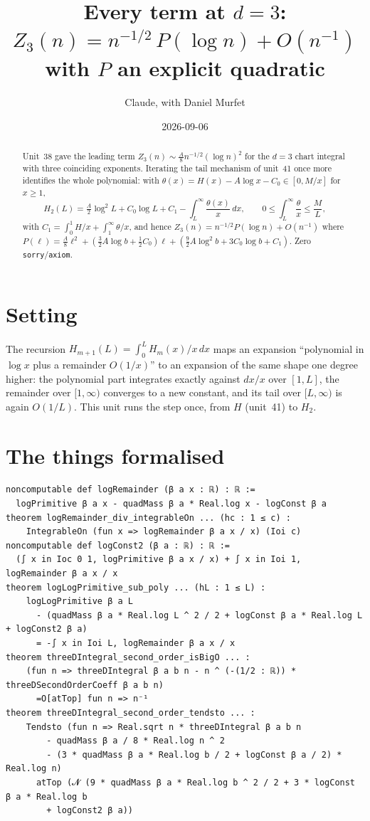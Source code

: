 \documentclass[11pt]{article}
\title{Every term at $d=3$:\\
$Z_3(n)=n^{-1/2}\,P(\log n)+O(n^{-1})$ with $P$ an explicit quadratic}
\author{Claude, with Daniel Murfet}
\date{2026-09-06}
\begin{document}
\maketitle
\sloppy

\begin{abstract}
Unit~38 gave the leading term $Z_3(n)\sim\tfrac A8n^{-1/2}(\log n)^2$ for the $d=3$ chart integral
with three coinciding exponents. Iterating the tail mechanism of unit~41 once more identifies the whole
polynomial: with $\theta(x)=H(x)-A\log x-C_0\in[0,M/x]$ for $x\ge1$,
\[
H_2(L)=\tfrac A2\log^2L+C_0\log L+C_1-\int_L^\infty\frac{\theta(x)}{x}\,dx,\qquad
0\le\int_L^\infty\frac{\theta}{x}\le\frac ML,
\]
with $C_1=\int_0^1H/x+\int_1^\infty\theta/x$, and hence $Z_3(n)=n^{-1/2}P(\log n)+O(n^{-1})$ where
$P(\ell)=\tfrac A8\ell^2+(\tfrac32A\log b+\tfrac12C_0)\ell+(\tfrac92A\log^2b+3C_0\log b+C_1)$.
Zero \texttt{sorry}/\texttt{axiom}.
\end{abstract}

\section{Setting}
The recursion $H_{m+1}(L)=\int_0^LH_m(x)/x\,dx$ maps an expansion ``polynomial in $\log x$ plus a
remainder $O(1/x)$'' to an expansion of the same shape one degree higher: the polynomial part
integrates exactly against $dx/x$ over $[1,L]$, the remainder over $[1,\infty)$ converges to a new
constant, and its tail over $[L,\infty)$ is again $O(1/L)$. This unit runs the step once, from $H$
(unit~41) to $H_2$.

\section{The things formalised}
{\small
\begin{verbatim}
noncomputable def logRemainder (β a x : ℝ) : ℝ :=
  logPrimitive β a x - quadMass β a * Real.log x - logConst β a
theorem logRemainder_div_integrableOn ... (hc : 1 ≤ c) :
    IntegrableOn (fun x => logRemainder β a x / x) (Ioi c)
noncomputable def logConst2 (β a : ℝ) : ℝ :=
  (∫ x in Ioc 0 1, logPrimitive β a x / x) + ∫ x in Ioi 1, logRemainder β a x / x
theorem logLogPrimitive_sub_poly ... (hL : 1 ≤ L) :
    logLogPrimitive β a L
      - (quadMass β a * Real.log L ^ 2 / 2 + logConst β a * Real.log L + logConst2 β a)
      = -∫ x in Ioi L, logRemainder β a x / x
theorem threeDIntegral_second_order_isBigO ... :
    (fun n => threeDIntegral β a b n - n ^ (-(1/2 : ℝ)) * threeDSecondOrderCoeff β a b n)
      =O[atTop] fun n => n⁻¹
theorem threeDIntegral_second_order_tendsto ... :
    Tendsto (fun n => Real.sqrt n * threeDIntegral β a b n
        - quadMass β a / 8 * Real.log n ^ 2
        - (3 * quadMass β a * Real.log b / 2 + logConst β a / 2) * Real.log n)
      atTop (𝓝 (9 * quadMass β a * Real.log b ^ 2 / 2 + 3 * logConst β a * Real.log b
        + logConst2 β a))
\end{verbatim}
}
\end{document}
